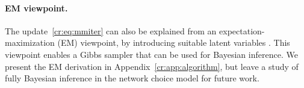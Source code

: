 \paragraph{EM viewpoint.}
The update~\eqref{cr:eq:mmiter} can also be explained from an expectation-maximization (EM) viewpoint, by introducing suitable latent variables \citep{caron2012efficient}.
This viewpoint enables a Gibbs sampler that can be used for Bayesian inference.
We present the EM derivation in Appendix~\ref{cr:app:algorithm}, but leave a study of fully Bayesian inference in the network choice model for future work.
